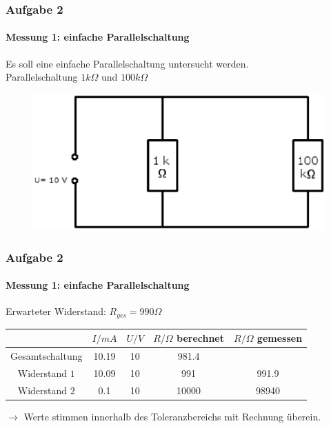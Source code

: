 \begin{frame}
\frametitle{Aufgabe 2}
\framesubtitle{Messung 1: einfache Parallelschaltung}
    Es soll eine einfache Parallelschaltung untersucht werden.\\
    Parallelschaltung $1k\Omega$ und $100k\Omega$
    \begin{figure}[H]
    \begin{center}
            \includegraphics[scale=0.60]{./img/parallelschaltungfrei.eps}
    \end{center}
    \end{figure}
    
\end{frame}
\begin{frame}
\frametitle{Aufgabe 2}
\framesubtitle{Messung 1: einfache Parallelschaltung}
    Erwarteter Widerstand: $R_{ges} = 990 \Omega$
    \hline
    \begin{tabular}{c| c c|c|c}
                        & $I/mA$ & $U/V$ & $R/\Omega$ berechnet& $R/\Omega$ gemessen \\
                        \hline
        Gesamtschaltung & 10.19&10&981.4& \\
        Widerstand $1$  & 10.09&10&991&991.9 \\
        Widerstand $2$  & 0.1&10&10000&98940 
    \end{tabular}
    $\rightarrow$ Werte stimmen innerhalb des Toleranzbereichs mit Rechnung überein.
\end{frame}

